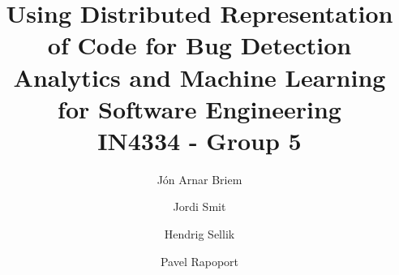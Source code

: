 \documentclass[sigconf]{acmart}
\begin{document}
\title[]{Using Distributed Representation of Code for Bug Detection \\ \small Analytics and Machine Learning for Software Engineering \\ IN4334 - Group 5 \\}

\author{Jón Arnar Briem}


\author{Jordi Smit}

\author{Hendrig Sellik}

\author{Pavel Rapoport}




\keywords{}

\maketitle















\end{document}
